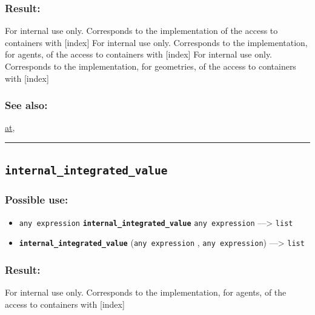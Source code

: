 \documentclass[]{book}
\providecommand{\tightlist}{%
  \setlength{\itemsep}{0pt}\setlength{\parskip}{0pt}}
\theoremstyle{definition}
\theoremstyle{definition}
\theoremstyle{definition}
\theoremstyle{remark}
\begin{document}
\subsubsection{Result:}\label{result-269}

For internal use only. Corresponds to the implementation of the access
to containers with {[}index{]} For internal use only. Corresponds to the
implementation, for agents, of the access to containers with {[}index{]}
For internal use only. Corresponds to the implementation, for
geometries, of the access to containers with {[}index{]}

\subsubsection{See also:}\label{see-also-120}

\href{operators-a-to-a.html\#at}{at},

\begin{center}\rule{0.5\linewidth}{\linethickness}\end{center}

\subsection{\texorpdfstring{\texttt{internal\_integrated\_value}}{internal\_integrated\_value}}\label{internal_integrated_value}

\subsubsection{Possible use:}\label{possible-use-280}

\begin{itemize}
\tightlist
\item
  \texttt{any\ expression} \textbf{\texttt{internal\_integrated\_value}}
  \texttt{any\ expression} ---\textgreater{} \texttt{list}
\item
  \textbf{\texttt{internal\_integrated\_value}}
  (\texttt{any\ expression} , \texttt{any\ expression})
  ---\textgreater{} \texttt{list}
\end{itemize}

\subsubsection{Result:}\label{result-270}

For internal use only. Corresponds to the implementation, for agents, of
the access to containers with {[}index{]}
\end{document}
